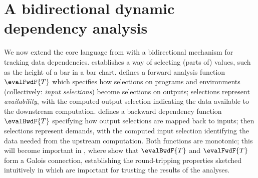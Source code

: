 \section{A bidirectional dynamic dependency analysis}
\label{sec:data-dependencies}

We now extend the core language from  with a bidirectional mechanism for tracking data dependencies.  establishes a way of selecting (parts of) values, such as the height of a bar in a bar chart.  defines a forward analysis function $\evalFwdF{T}$ which specifies how selections on programs and environments (collectively: \emph{input selections}) become selections on outputs; selections represent \emph{availability}, with the computed output selection indicating the data available to the downstream computation.  defines a backward dependency function $\evalBwdF{T}$ specifying how output selections are mapped back to inputs; then selections represent demands, with the computed input selection identifying the data needed from the upstream computation. Both functions are monotonic; this will become important in , where show that $\evalBwdF{T}$ and $\evalFwdF{T}$ form a Galois connection, establishing the round-tripping properties sketched intuitively in  which are important for trusting the results of the analyses.



